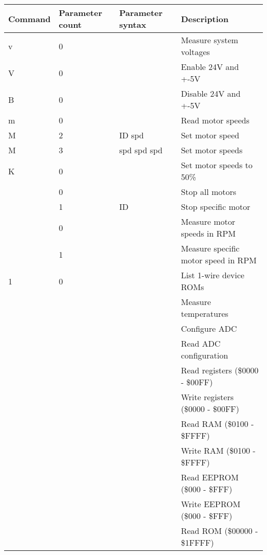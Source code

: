 \documentclass{article}
\begin{document}
\begin{table}[H]
\begin{centering}
\begin{tabular}{|p{1.8cm}|p{1.8cm}|p{1.8cm}|p{5cm}|}
\hline
{\bf Command} & {\bf Parameter count} & {\bf Parameter syntax} & {\bf Description} \\ \hline
v & 0 &                     & Measure system voltages \\ \hline
V & 0 &                     & Enable 24V and +-5V \\ \hline
B & 0 &                     & Disable 24V and +-5V \\ \hline
m & 0 &                     & Read motor speeds \\ \hline
M & 2 & ID spd              & Set motor speed \\ \hline
M & 3 & spd spd spd         & Set motor speeds \\ \hline
K & 0 &                     & Set motor speeds to 50\% \\ \hline
  & 0 &                     & Stop all motors \\ \hline
  & 1 & ID                  & Stop specific motor \\ \hline
  & 0 &                     & Measure motor speeds in RPM \\ \hline
  & 1 &                     & Measure specific motor speed in RPM \\ \hline
1 & 0 &                     & List 1-wire device ROMs \\ \hline
  &   &                     & Measure temperatures \\ \hline
  &   &                     & Configure ADC \\ \hline
  &   &                     & Read ADC configuration \\ \hline
  &   &                     & Read registers (\$0000 - \$00FF) \\ \hline
  &   &                     & Write registers (\$0000 - \$00FF) \\ \hline
  &   &                     & Read RAM (\$0100 - \$FFFF) \\ \hline
  &   &                     & Write RAM (\$0100 - \$FFFF) \\ \hline
  &   &                     & Read EEPROM (\$000 - \$FFF) \\ \hline
  &   &                     & Write EEPROM (\$000 - \$FFF) \\ \hline
  &   &                     & Read ROM (\$00000 - \$1FFFF) \\ \hline

\end{tabular}
\end{centering}
\end{table}
\end{document}
